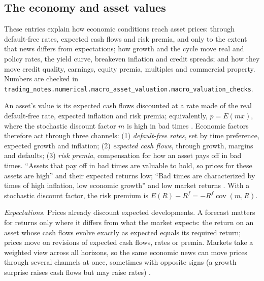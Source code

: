 \subsection{The economy and asset values}

These entries explain how economic conditions reach asset prices: through default-free rates, expected cash flows and risk premia, and only to the extent that news differs from expectations; how growth and the cycle move real and policy rates, the yield curve, breakeven inflation and credit spreads; and how they move credit quality, earnings, equity premia, multiples and commercial property. Numbers are checked in \nolinkurl{trading_notes.numerical.macro_asset_valuation.macro_valuation_checks}.

\begin{qfresult}\label{res:economy-discount-rates-cash-flows}
 An asset's value is its expected cash flows discounted at a rate made of the real default-free rate, expected inflation and risk premia; equivalently, $p=E(mx)$, where the stochastic discount factor $m$ is high in bad times \citep[sec.~1.4, pp.~20--23]{asset-pricing-manuscript-2000}. Economic factors therefore act through three channels: (1) \emph{default-free rates}, set by time preference, expected growth and inflation; (2) \emph{expected cash flows}, through growth, margins and defaults; (3) \emph{risk premia}, compensation for how an asset pays off in bad times. ``Assets that pay off in bad times are valuable to hold, so prices for these assets are high'' and their expected returns low; ``Bad times are characterized by times of high inflation, low economic growth'' and low market returns \citep[chap.~6, secs.~3.6--4, pp.~202--206]{s7-ang}. With a stochastic discount factor, the risk premium is $E(R)-R^f=-R^f\operatorname{cov}(m,R)$.

\emph{Expectations.} Prices already discount expected developments. A forecast matters for returns only where it differs from what the market expects: the return on an asset whose cash flows evolve exactly as expected equals its required return; prices move on revisions of expected cash flows, rates or premia. Markets take a weighted view across all horizons, so the same economic news can move prices through several channels at once, sometimes with opposite signs (a growth surprise raises cash flows but may raise rates) \citep[chap.~3, sec.~3.4.2, p.~64]{portfolio-management-in-practice-v1-2020}.


\end{qfresult}

